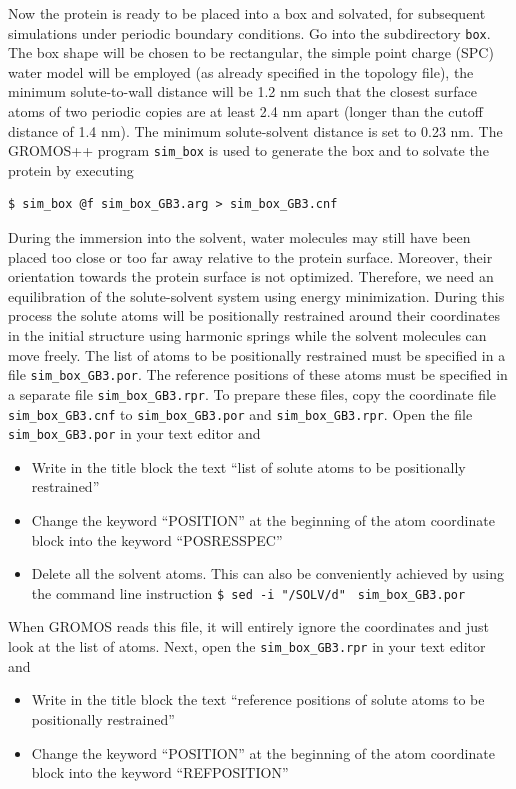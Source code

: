 Now the protein is ready to be placed into a box and solvated, for subsequent simulations under periodic boundary conditions. Go into the subdirectory \texttt{box}. The box shape will be chosen to be rectangular, the simple point charge (SPC) water model \cite{Berendsen1981} will be employed (as already specified in the topology file), the minimum solute-to-wall distance will be 1.2 nm such that the closest surface atoms of two periodic copies are at least 2.4 nm apart (longer than the cutoff distance of 1.4 nm). The minimum solute-solvent distance is set to 0.23 nm. The GROMOS++ program \texttt{sim\_box} is used to generate the box and to solvate the protein by executing
\begin{lstlisting}
$ sim_box @f sim_box_GB3.arg > sim_box_GB3.cnf
\end{lstlisting}
During the immersion into the solvent, water molecules may still have been placed too close or too far away relative to the protein surface. Moreover, their orientation towards the protein surface is not optimized. Therefore, we need an equilibration of the solute-solvent system using energy minimization. During this process the solute atoms will be positionally restrained around their coordinates in the initial structure using harmonic springs while the solvent molecules can move freely. The list of atoms to be positionally restrained must be specified in a file \texttt{sim\_box\_GB3.por}. The reference positions of these atoms must be specified in a separate file \texttt{sim\_box\_GB3.rpr}. To prepare these files, copy the coordinate file \texttt{sim\_box\_GB3.cnf} to \texttt{sim\_box\_GB3.por} and \texttt{sim\_box\_GB3.rpr}. Open the file \texttt{sim\_box\_GB3.por} in your text editor and
\begin{itemize}
\item	Write in the title block the text “list of solute atoms to be positionally restrained”
\item	Change the keyword “POSITION” at the beginning of the atom coordinate block into the keyword “POSRESSPEC”
\item	Delete all the solvent atoms. This can also be conveniently achieved by using the command line instruction \lstinline !$ sed -i "/SOLV/d"! \lstinline! sim_box_GB3.por!
\end{itemize}
When GROMOS reads this file, it will entirely ignore the coordinates and just look at the list of atoms. Next, open the \texttt{sim\_box\_GB3.rpr} in your text editor and
\begin{itemize} 
\item	Write in the title block the text “reference positions of solute atoms to be positionally restrained”
\item	Change the keyword “POSITION” at the beginning of the atom coordinate block into the keyword “REFPOSITION”
\end{itemize}
